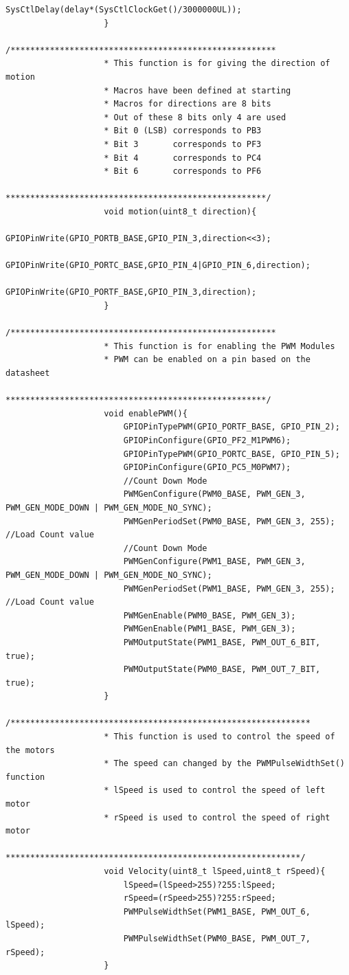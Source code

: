 \documentclass[a4paper,10pt,oneside]{article}
\begin{document}
\begin{lstlisting}[style=CStyle]
						SysCtlDelay(delay*(SysCtlClockGet()/3000000UL));
					}
					/******************************************************
					* This function is for giving the direction of motion
					* Macros have been defined at starting
					* Macros for directions are 8 bits
					* Out of these 8 bits only 4 are used
					* Bit 0 (LSB) corresponds to PB3
					* Bit 3       corresponds to PF3
					* Bit 4       corresponds to PC4
					* Bit 6       corresponds to PF6
					*****************************************************/
					void motion(uint8_t direction){
						GPIOPinWrite(GPIO_PORTB_BASE,GPIO_PIN_3,direction<<3);
						GPIOPinWrite(GPIO_PORTC_BASE,GPIO_PIN_4|GPIO_PIN_6,direction);
						GPIOPinWrite(GPIO_PORTF_BASE,GPIO_PIN_3,direction);
					}
					/******************************************************
					* This function is for enabling the PWM Modules
					* PWM can be enabled on a pin based on the datasheet
					*****************************************************/
					void enablePWM(){
						GPIOPinTypePWM(GPIO_PORTF_BASE, GPIO_PIN_2);
						GPIOPinConfigure(GPIO_PF2_M1PWM6);
						GPIOPinTypePWM(GPIO_PORTC_BASE, GPIO_PIN_5);
						GPIOPinConfigure(GPIO_PC5_M0PWM7);
						//Count Down Mode
						PWMGenConfigure(PWM0_BASE, PWM_GEN_3, PWM_GEN_MODE_DOWN | PWM_GEN_MODE_NO_SYNC);
						PWMGenPeriodSet(PWM0_BASE, PWM_GEN_3, 255); //Load Count value
						//Count Down Mode
						PWMGenConfigure(PWM1_BASE, PWM_GEN_3, PWM_GEN_MODE_DOWN | PWM_GEN_MODE_NO_SYNC);
						PWMGenPeriodSet(PWM1_BASE, PWM_GEN_3, 255); //Load Count value
						PWMGenEnable(PWM0_BASE, PWM_GEN_3);
						PWMGenEnable(PWM1_BASE, PWM_GEN_3);
						PWMOutputState(PWM1_BASE, PWM_OUT_6_BIT, true);
						PWMOutputState(PWM0_BASE, PWM_OUT_7_BIT, true);
					}
					/*************************************************************
					* This function is used to control the speed of the motors
					* The speed can changed by the PWMPulseWidthSet() function
					* lSpeed is used to control the speed of left motor
					* rSpeed is used to control the speed of right motor
					************************************************************/
					void Velocity(uint8_t lSpeed,uint8_t rSpeed){
						lSpeed=(lSpeed>255)?255:lSpeed;
						rSpeed=(rSpeed>255)?255:rSpeed;
						PWMPulseWidthSet(PWM1_BASE, PWM_OUT_6, lSpeed);
						PWMPulseWidthSet(PWM0_BASE, PWM_OUT_7, rSpeed);
					}
				\end{lstlisting}
				
\end{document}
